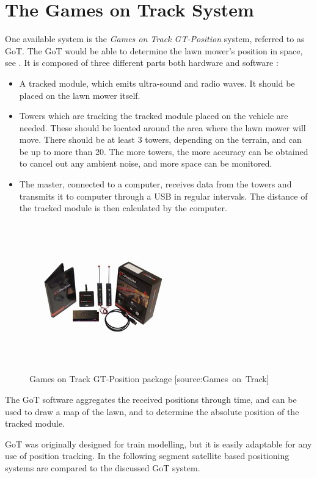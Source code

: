 \section{The Games on Track System}
One available system is the \emph{Games on Track GT-Position} system, referred to as GoT. The GoT would be able to determine the lawn mower's position in space, see . It is composed of three different parts both hardware and software \cite{GoTWebsitePos}:

\begin{itemize}
	\item A tracked module, which emits ultra-sound and radio waves. It should be placed on the lawn mower itself.
	\item Towers which are tracking the tracked module placed on the vehicle are needed. These should be located around the area where the lawn mower will move. There should be at least 3 towers, depending on the terrain, and can be up to more than 20. The more towers, the more accuracy can be obtained to cancel out any ambient noise, and more space can be monitored.
	\item The master, connected to a computer, receives data from the towers and transmits it to computer through a USB in regular intervals. The distance of the tracked module is then calculated by the computer.
\end{itemize}

\begin{figure}[H]
\centering
\includegraphics[scale=1.1]{figures/gotSystem.jpg} 
\caption{Games on Track GT-Position package [source:Games\ on\ Track]} 
\label{fig:GoTsystem}
\end{figure}
\noindent
%
The GoT software aggregates the received positions through time, and can be used to draw a map of the lawn, and to determine the absolute position of the tracked module.

GoT was originally designed for train modelling, but it is easily adaptable for any use of position tracking. In the following segment satellite based positioning systems are compared to the discussed GoT system.